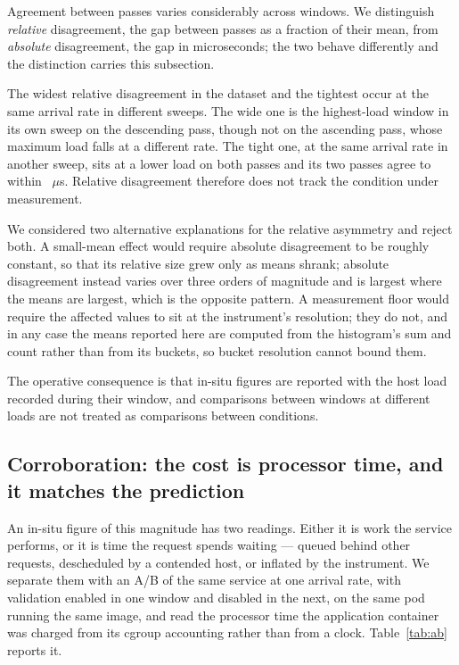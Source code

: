\documentclass[pdflatex,sn-basic,twocolumn]{sn-jnl}%
\begin{document}
Agreement between passes varies considerably across windows. We distinguish
\emph{relative} disagreement, the gap between passes as a fraction of their mean,
from \emph{absolute} disagreement, the gap in microseconds; the two behave
differently and the distinction carries this subsection.

The widest relative disagreement in the dataset and the tightest occur at the same
arrival rate in different sweeps. The wide one is the highest-load window in its
own sweep on the descending pass, though not on the ascending pass, whose maximum
load falls at a different rate. The tight one, at the same arrival rate in another
sweep, sits at a lower load on both passes and its two passes agree to within
\InsituTightestAgreement~$\mu$s. Relative disagreement therefore does not track
the condition under measurement.

We considered two alternative explanations for the relative asymmetry and reject
both. A small-mean effect would require absolute disagreement to be roughly
constant, so that its relative size grew only as means shrank; absolute
disagreement instead varies over three orders of magnitude and is largest where
the means are largest, which is the opposite pattern. A measurement floor would
require the affected values to sit at the instrument's resolution; they do not,
and in any case the means reported here are computed from the histogram's sum and
count rather than from its buckets, so bucket resolution cannot bound them.

The operative consequence is that in-situ figures are reported with the host load
recorded during their window, and comparisons between windows at different loads
are not treated as comparisons between conditions.

\subsection{Corroboration: the cost is processor time, and it matches the
prediction}\label{sec:abcorroboration}

An in-situ figure of this magnitude has two readings. Either it is work the
service performs, or it is time the request spends waiting --- queued behind
other requests, descheduled by a contended host, or inflated by the instrument.
We separate them with an A/B of the same service at one arrival rate, with
validation enabled in one window and disabled in the next, on the same pod
running the same image, and read the processor time the application container
was charged from its cgroup accounting rather than from a clock.
Table~\ref{tab:ab} reports it.
\end{document}
